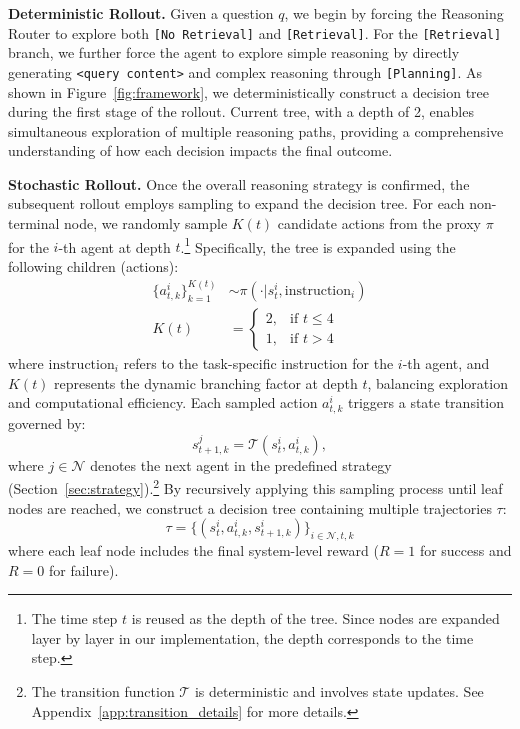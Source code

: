 \textbf{Deterministic Rollout.} Given a question $q$, we begin by forcing the Reasoning Router to explore both \texttt{[No Retrieval]} and \texttt{[Retrieval]}. 
For the \texttt{[Retrieval]} branch, we further force the agent to explore simple reasoning by directly generating \texttt{<query content>} and complex reasoning through \texttt{[Planning]}.
As shown in Figure~\ref{fig:framework}, we deterministically construct a decision tree during the first stage of the rollout.
Current tree, with a depth of 2, enables simultaneous exploration of multiple reasoning paths, providing a comprehensive understanding of how each decision impacts the final outcome.

\textbf{Stochastic Rollout.} Once the overall reasoning strategy is confirmed, the subsequent rollout employs sampling to expand the decision tree. 
For each non-terminal node, we randomly sample $K(t)$ candidate actions from the proxy $\pi$ for the $i$-th agent at depth $t$.\footnote{The time step $t$ is reused as the depth of the tree. Since nodes are expanded layer by layer in our implementation, the depth corresponds to the time step.}
Specifically, the tree is expanded using the following children (actions):
%
\begin{align}
    \{a^i_{t,k}\}_{k=1}^{K(t)} &\sim \pi(\cdot|s^i_t, \text{instruction}_i) \\
    K(t) &= \begin{cases}
        2, & \text{if } t \leq 4 \\
        1, & \text{if } t > 4
    \end{cases}
\end{align}
%
where $\text{instruction}_i$ refers to the task-specific instruction for the $i$-th agent, and $K(t)$ represents the dynamic branching factor at depth $t$, balancing exploration and computational efficiency. 
Each sampled action $a^i_{t,k}$ triggers a state transition governed by:
%
\vspace{-0.5em}
\begin{equation}
    s^j_{t+1,k} = \mathcal{T}(s^i_t, a^i_{t,k}),
\end{equation}
%
where $j\in \mathcal{N}$ denotes the next agent in the predefined strategy (Section~\ref{sec:strategy}).\footnote{The transition function \(\mathcal{T}\) is deterministic and involves state updates. See Appendix~\ref{app:transition_details} for more details.} %
By recursively applying this sampling process until leaf nodes are reached, we construct a decision tree containing multiple trajectories $\tau$:
%
\begin{equation}
    \tau = \{(s^i_t, a^i_{t,k}, s^i_{t+1,k})\}_{i\in \mathcal{N},t,k}
\end{equation}
%
where each leaf node includes the final system-level reward ($R=1$ for success and $R=0$ for failure).

